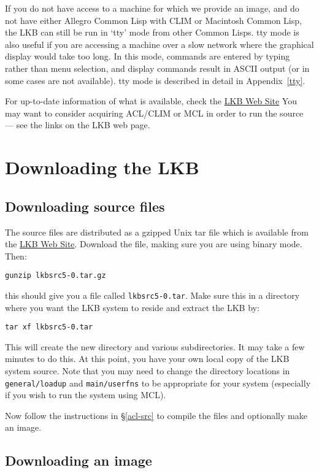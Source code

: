 \documentclass[12pt]{report}
\begin{document}
If you do not have access to a machine for which we provide an image,
and do not have either Allegro Common Lisp with CLIM or Macintosh Common
Lisp, the LKB can still be run in `tty' mode from other Common Lisps.
tty mode is also useful if you are accessing a machine over a slow network
where the graphical display would take too long.
In this mode, commands are entered by typing rather than menu selection,
and display commands result in ASCII output (or in some cases are
not available).
tty mode is described in detail in Appendix~\ref{tty}.

For up-to-date information of what is available, check the 
\href{http://www-csli.stanford.edu/~aac/lkb.html}{LKB Web Site}
You may want
to consider acquiring ACL/CLIM or MCL in order to run the source
--- see the links on the LKB web page.

\section{Downloading the LKB}
\label{down}

\subsection{Downloading source files}
\label{down-src}

The source files are distributed as a 
gzipped Unix tar file which is available from the
\href{http://www-csli.stanford.edu/~aac/lkb.html}{LKB Web Site}.
Download the file, making sure you are using binary mode.
Then:
\begin{verbatim}
gunzip lkbsrc5-0.tar.gz
\end{verbatim}
this should give you a file called {\tt lkbsrc5-0.tar}.  
Make sure this in a directory where you want the LKB system to reside
and extract the LKB by:
\begin{verbatim}
tar xf lkbsrc5-0.tar
\end{verbatim}
This will create the new directory and various subdirectories.
It may take a few minutes to do this.  At this point, you have 
your own local copy of the LKB system source.  Note that
you may need to change the directory locations in {\tt general/loadup}
and {\tt main/userfns}
to be appropriate for your system
(especially if you wish to run the system using MCL).


Now follow the instructions in \S\ref{acl-src} to compile the
files and optionally
make an image. 


\subsection{Downloading an image}
\label{down-images}
\end{document}
